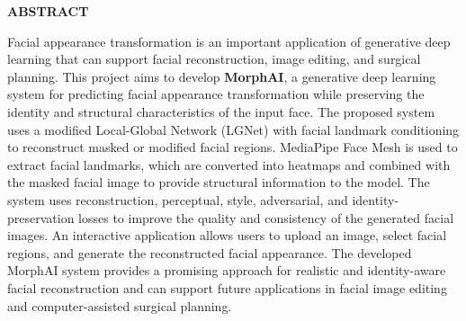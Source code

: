 \begin{center}
    {\Large\bfseries ABSTRACT}
\end{center}
\vspace{1em}
\normalsize
\noindent
Facial appearance transformation is an important application of generative deep learning that can support facial reconstruction, image editing, and surgical planning. This project aims to develop \textbf{MorphAI}, a generative deep learning system for predicting facial appearance transformation while preserving the identity and structural characteristics of the input face. The proposed system uses a modified Local-Global Network (LGNet) with facial landmark conditioning to reconstruct masked or modified facial regions. MediaPipe Face Mesh is used to extract facial landmarks, which are converted into heatmaps and combined with the masked facial image to provide structural information to the model. The system uses reconstruction, perceptual, style, adversarial, and identity-preservation losses to improve the quality and consistency of the generated facial images. An interactive application allows users to upload an image, select facial regions, and generate the reconstructed facial appearance. The developed MorphAI system provides a promising approach for realistic and identity-aware facial reconstruction and can support future applications in facial image editing and computer-assisted surgical planning.

